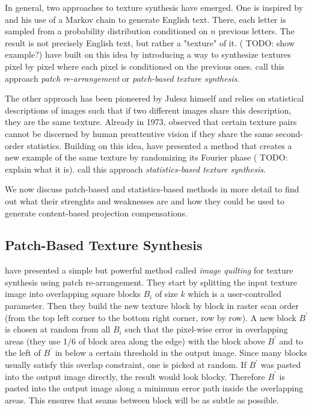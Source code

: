In general, two approaches to texture synthesis have emerged. One is inspired by \citet{Shannon1948} and his use of a Markov chain to generate English text. There, each letter is sampled from a probability distribution conditioned on \(n\) previous letters. The result is not precisely English text, but rather a "texture" of it. ({\color{red} TODO: show example?}) \citet{Efros1999} have built on this idea by introducing a way to synthesize textures pixel by pixel where each pixel is conditioned on the previous ones. \citet{Raad2018} call this approach \textit{patch re-arrangement} or \textit{patch-based texture synthesis}.

The other approach has been pioneered by Julesz himself and relies on statistical descriptions of images such that if two different images share this description, they are the same texture. Already in 1973, \citet{Julesz1973} observed that certain texture pairs cannot be discerned by human preattentive vision if they share the same second-order statistics. Building on this idea, \citet{Galerne2011} have presented a method that creates a new example of the same texture by randomizing its Fourier phase ({\color{red} TODO: explain what it is}). \citet{Raad2018} call this approach \textit{statistics-based texture synthesis}.

We now discuss patch-based and statistics-based methods in more detail to find out what their strenghts and weaknesses are and how they could be used to generate content-based projection compensations.

\subsection{Patch-Based Texture Synthesis}
\label{section:background-texture_synthesis-patch_based}

\citet{Efros2001} have presented a simple but powerful method called \textit{image quilting} for texture synthesis using patch re-arrangement. They start by splitting the input texture image into overlapping square blocks \(B_i\) of size \(k\) which is a user-controlled parameter. Then they build the new texture block by block in raster scan order (from the top left corner to the bottom right corner, row by row). A new block \(B^{\prime}\) is chosen at random from all \(B_i\) such that the pixel-wise error in overlapping areas (they use 1/6 of block area along the edge) with the block above \(B^{\prime}\) and to the left of \(B^{\prime}\) in below a certain threshold in the output image. Since many blocks usually satisfy this overlap constraint, one is picked at random. If \(B^{\prime}\) was pasted into the output image directly, the result would look blocky. Therefore \(B^{\prime}\) is pasted into the output image along a minimum error path inside the overlapping areas. This ensures that seams between block will be as subtle as possible.

